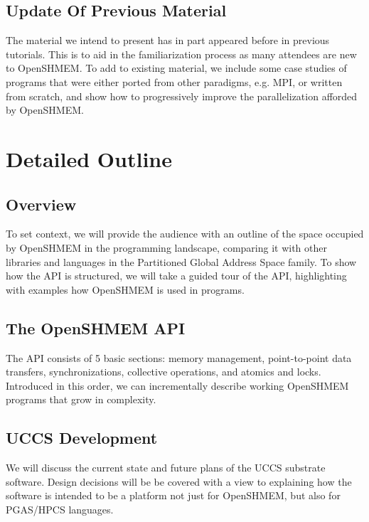 \documentclass[10pt,english]{article}
\begin{document}
\subsection{Update Of Previous Material}

The material we intend to present has in part appeared before in
previous tutorials.  This is to aid in the familiarization process as
many attendees are new to OpenSHMEM.  To add to existing material, we
include some case studies of programs that were either ported from
other paradigms, e.g. MPI, or written from scratch, and show how to
progressively improve the parallelization afforded by OpenSHMEM.

\section{Detailed Outline}

\subsection{Overview}

  To set context, we will provide the audience with an outline of the
  space occupied by OpenSHMEM in the programming landscape, comparing
  it with other libraries and languages in the Partitioned Global
  Address Space family.  To show how the API is structured, we will
  take a guided tour of the API, highlighting with examples how
  OpenSHMEM is used in programs.

\subsection{The OpenSHMEM API}

  The API consists of 5 basic sections: memory management,
  point-to-point data transfers, synchronizations, collective
  operations, and atomics and locks.  Introduced in this order, we can
  incrementally describe working OpenSHMEM programs that grow in
  complexity.

\subsection{UCCS Development}

  We will discuss the current state and future plans of the UCCS
  substrate software.  Design decisions will be be covered with a view
  to explaining how the software is intended to be a platform not just
  for OpenSHMEM, but also for PGAS/HPCS languages.
\end{document}
